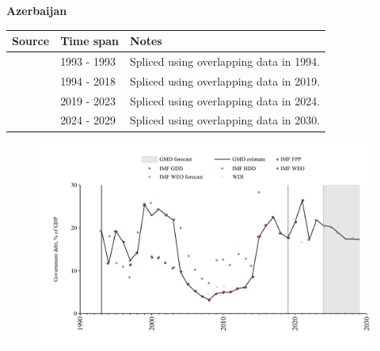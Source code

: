 \documentclass[12pt,a4paper,landscape]{article}
\begin{document}
\begin{adjustbox}{max totalsize={\paperwidth}{\paperheight},center}
\begin{minipage}[t][\textheight][t]{\textwidth}
\vspace*{0.5cm}
{}
\begin{center}
{\Large\bfseries Azerbaijan}
\end{center}
\vspace{0.5cm}
\begin{table}[H]
\centering
\small
\begin{tabular}{|l|l|l|}
\hline
\textbf{Source} & \textbf{Time span} & \textbf{Notes} \\
\hline
\rowcolor{white}\cite{IMF_HDD}& 1993 - 1993 &Spliced using overlapping data in 1994.\\
\rowcolor{lightgray}\cite{IMF_GDD}& 1994 - 2018 &Spliced using overlapping data in 2019.\\
\rowcolor{white}\cite{IMF_FPP}& 2019 - 2023 &Spliced using overlapping data in 2024.\\
\rowcolor{lightgray}\cite{IMF_WEO_forecast}& 2024 - 2029 &Spliced using overlapping data in 2030.\\
\hline
\end{tabular}
\end{table}
\begin{figure}[H]
\centering
\includegraphics[width=\textwidth,height=0.6\textheight,keepaspectratio]{graphs/AZE_govdebt_GDP.pdf}
\end{figure}
\end{minipage}
\end{adjustbox}
\end{document}
